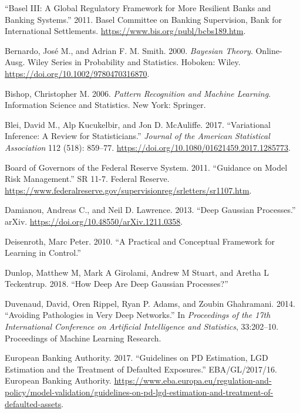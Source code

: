 \documentclass[
  letterpaper,
  DIV=11,
  numbers=noendperiod]{scrartcl}
\newlength{\cslhangindent}
\newenvironment{CSLReferences}[2] %
 {\begin{list}{}{%
  \setlength{\itemindent}{0pt}
  \setlength{\leftmargin}{0pt}
  \setlength{\parsep}{0pt}
  \ifodd #1
   \setlength{\leftmargin}{\cslhangindent}
   \setlength{\itemindent}{-1\cslhangindent}
  \fi
  \setlength{\itemsep}{#2\baselineskip}}}
 {\end{list}}
\begin{document}
\label{refs}
\begin{CSLReferences}{1}{0}
{``Basel {III}: A Global Regulatory Framework for More Resilient Banks
and Banking Systems.''} 2011. Basel Committee on Banking Supervision,
Bank for International Settlements.
\url{https://www.bis.org/publ/bcbs189.htm}.

Bernardo, José M., and Adrian F. M. Smith. 2000. \emph{Bayesian
{Theory}}. Online-Ausg. Wiley Series in Probability and Statistics.
Hoboken: Wiley. \url{https://doi.org/10.1002/9780470316870}.

Bishop, Christopher M. 2006. \emph{Pattern Recognition and Machine
Learning}. Information Science and Statistics. New York: Springer.

Blei, David M., Alp Kucukelbir, and Jon D. McAuliffe. 2017.
{``Variational Inference: {A} Review for Statisticians.''} \emph{Journal
of the American Statistical Association} 112 (518): 859--77.
\url{https://doi.org/10.1080/01621459.2017.1285773}.

Board of Governors of the Federal Reserve System. 2011. {``Guidance on
Model Risk Management.''} SR 11-7. Federal Reserve.
\url{https://www.federalreserve.gov/supervisionreg/srletters/sr1107.htm}.

Damianou, Andreas C., and Neil D. Lawrence. 2013. {``Deep {Gaussian}
{Processes}.''} arXiv. \url{https://doi.org/10.48550/arXiv.1211.0358}.

Deisenroth, Marc Peter. 2010. {``A {Practical} and {Conceptual}
{Framework} for {Learning} in {Control}.''}

Dunlop, Matthew M, Mark A Girolami, Andrew M Stuart, and Aretha L
Teckentrup. 2018. {``How {Deep} {Are} {Deep} {Gaussian} {Processes}?''}

Duvenaud, David, Oren Rippel, Ryan P. Adams, and Zoubin Ghahramani.
2014. {``Avoiding Pathologies in Very Deep Networks.''} In
\emph{Proceedings of the 17th International Conference on Artificial
Intelligence and Statistics}, 33:202--10. Proceedings of Machine
Learning Research.

European Banking Authority. 2017. {``Guidelines on {PD} Estimation,
{LGD} Estimation and the Treatment of Defaulted Exposures.''}
EBA/GL/2017/16. European Banking Authority.
\url{https://www.eba.europa.eu/regulation-and-policy/model-validation/guidelines-on-pd-lgd-estimation-and-treatment-of-defaulted-assets}.


\end{CSLReferences}
\end{document}
